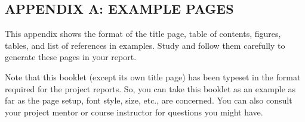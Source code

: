 \documentclass[12pt]{article} %
\renewcommand{\appendixname}{APPENDIX \thesection:}
\numberwithin{equation}{section}
\numberwithin{figure}{section}
\numberwithin{table}{section}
\numberwithin{algorithm}{section}
\begin{document}
\begin{appendix}
    \titleformat{\section}[block]{\bfseries\fontsize{14}{16}\selectfont\centering}{\appendixname}{0.5em}{}

    \section*{APPENDIX A: EXAMPLE PAGES}
    This appendix shows the format of the title page, table of contents, figures, tables, and list of references in examples. Study and follow them carefully to generate these pages in your report.

    Note that this booklet (except its own title page) has been typeset in the format required for the project reports. So, you can take this booklet as an example as far as the page setup, font style, size, etc., are concerned. You can also consult your project mentor or course instructor for questions you might have.
    
\end{appendix}

\printbibliography
\end{document}

